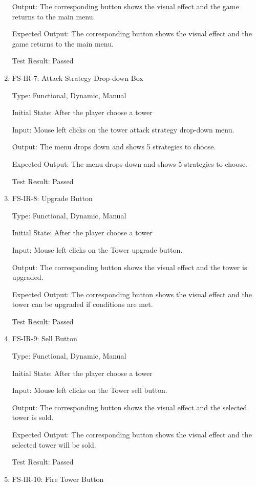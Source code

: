 \documentclass[12pt]{article}
\begin{document}
\begin{enumerate}
	Output: The corresponding button shows the visual effect and the game returns to the main menu.

	Expected Output: The corresponding button shows the visual effect and the game returns to the main menu.
	
	Test Result: Passed


	\item{FS-IR-7: Attack Strategy Drop-down Box}
					
	Type: Functional, Dynamic, Manual
					
	Initial State: After the player choose a tower
					
	Input: Mouse left clicks on the tower attack strategy drop-down menu.
					
	Output: The menu drops down and shows 5 strategies to choose.
					
	Expected Output: The menu drops down and shows 5 strategies to choose.
	
	Test Result: Passed
	
	
	\item{FS-IR-8: Upgrade Button}
					
	Type: Functional, Dynamic, Manual
					
	Initial State: After the player choose a tower
					
	Input: Mouse left clicks on the Tower upgrade button.
					
	Output: The corresponding button shows the visual effect and the tower is upgraded.
					
	Expected Output: The corresponding button shows the visual effect and the tower can be upgraded if conditions are met.
	
	Test Result: Passed
	
	
	\item{FS-IR-9: Sell Button}
					
	Type: Functional, Dynamic, Manual
					
	Initial State: After the player choose a tower
					
	Input: Mouse left clicks on the Tower sell button.
					
	Output: The corresponding button shows the visual effect and the selected tower is sold.
					
	Expected Output: The corresponding button shows the visual effect and the selected tower will be sold.
	
	Test Result: Passed
	
	
	\item{FS-IR-10: Fire Tower Button}
					

\end{enumerate}
\end{document}
